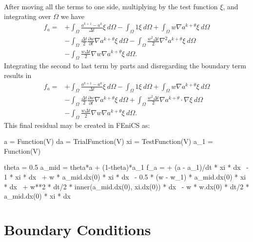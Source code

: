 \documentclass{article}%
\begin{document}
After moving all the terms to one side, multiplying by the test function $\xi$, and integrating over $\Omega$ we have
\begin{align*}
  f_a = 
  &+ \int_{\Omega} \frac{a^{k+1} - a^{k}}{\Delta t}\xi\ d\Omega 
  - \int_{\Omega} 1\xi\ d\Omega
  + \int_{\Omega} w \nabla{a}^{k+\theta} \xi\ d\Omega \\
  &- \int_{\Omega} \frac{\Delta t}{2} \frac{\partial w}{\partial t} 
    \nabla a^{k+\theta} \xi\ d\Omega 
  - \int_{\Omega} \frac{w^2 \Delta t}{2} 
    \nabla^2 a^{k+\theta} \xi\ d\Omega \\
  &- \int_{\Omega} \frac{w \Delta t}{2} 
    \nabla w \nabla a^{k+\theta} \xi\ d\Omega.
\end{align*}
Integrating the second to last term by parts and disregarding the boundary term results in
\begin{align*}
  f_a = 
  &+ \int_{\Omega} \frac{a^{k+1} - a^{k}}{\Delta t}\xi\ d\Omega 
  - \int_{\Omega} 1\xi\ d\Omega
  + \int_{\Omega} w \nabla{a}^{k+\theta} \xi\ d\Omega \\
  &- \int_{\Omega} \frac{\Delta t}{2} \frac{\partial w}{\partial t} 
    \nabla a^{k+\theta} \xi\ d\Omega 
  + \int_{\Omega} \frac{w^2 \Delta t}{2} 
    \nabla a^{k+\theta} \cdot \nabla \xi\ d\Omega \\
  &- \int_{\Omega} \frac{w \Delta t}{2} 
    \nabla w \nabla a^{k+\theta} \xi\ d\Omega.
\end{align*}
This final residual may be created in FEniCS as:

\begin{python}
a     = Function(V)
da    = TrialFunction(V)
xi    = TestFunction(V)
a_1   = Function(V)

theta = 0.5 
a_mid = theta*a + (1-theta)*a_1
f_a   = + (a - a_1)/dt * xi * dx \
        - 1 * xi * dx \
        + w * a_mid.dx(0) * xi * dx \
        - 0.5 * (w - w_1) * a_mid.dx(0) * xi * dx \
        + w**2 * dt/2 * inner(a_mid.dx(0), xi.dx(0)) * dx \
        - w * w.dx(0) * dt/2 * a_mid.dx(0) * xi * dx
\end{python}


\section{Boundary Conditions}
\end{document}
